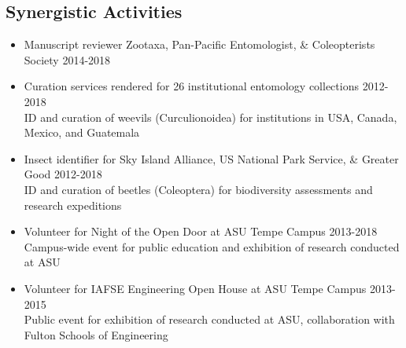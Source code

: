 \documentclass[11pt,a4paper]{extarticle}
\begin{document}
\subsection*{Synergistic Activities}
	\begin{itemize}
		\item Manuscript reviewer Zootaxa, Pan-Pacific Entomologist, \& Coleopterists Society \tabto*{5.65in} 2014-2018
		\item Curation services rendered for 26 institutional entomology collections \tabto*{5.65in} 2012-2018
		\\
		ID and curation of weevils (Curculionoidea) for institutions in USA, Canada, Mexico, and Guatemala
		\item Insect identifier for Sky Island Alliance, US National Park Service, \& Greater Good \tabto*{5.65in} 2012-2018
		\\
		ID and curation of beetles (Coleoptera) for biodiversity assessments and research expeditions
		\item Volunteer for Night of the Open Door at ASU Tempe Campus \tabto*{5.65in} 2013-2018
		\\
		Campus-wide event for public education and exhibition of research conducted at ASU
		\item Volunteer for IAFSE Engineering Open House at ASU Tempe Campus \tabto*{5.65in} 2013-2015
		\\
		Public event for exhibition of research conducted at ASU, collaboration with Fulton Schools of Engineering
	\end{itemize}
	
\end{document}

